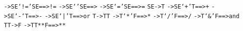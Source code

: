 {{{{\texttt{\small \phantom{ }-\textgreater \phantom{ }SE\phantom{ }‘!=’\phantom{ }SE\phantom{ }\phantom{ }\phantom{ }==\textgreater \phantom{ }!=}\mbox{}\newline
\texttt{\small \phantom{ }-\textgreater \phantom{ }SE\phantom{ }‘’\phantom{ }\phantom{ }SE\phantom{ }\phantom{ }\phantom{ }==\textgreater \phantom{ }}\mbox{}\newline
\texttt{\small \phantom{ }-\textgreater \phantom{ }SE\phantom{ }‘=’\phantom{ }SE\phantom{ }\phantom{ }\phantom{ }==\textgreater \phantom{ }=}\mbox{}\newline
\texttt{\small }\mbox{}\newline
\texttt{\small \phantom{ }SE\phantom{ }\phantom{ }-\textgreater \phantom{ }\phantom{ }T}\mbox{}\newline
\texttt{\small \phantom{ }-\textgreater \phantom{ }\phantom{ }SE\phantom{ }‘+’\phantom{ }T\phantom{ }\phantom{ }==\textgreater \phantom{ }+}\mbox{}\newline
\texttt{\small \phantom{ }-\textgreater \phantom{ }\phantom{ }SE\phantom{ }‘-‘\phantom{ }T\phantom{ }\phantom{ }==\textgreater \phantom{ }-}\mbox{}\newline
\texttt{\small \phantom{ }-\textgreater \phantom{ }\phantom{ }SE\phantom{ }‘|’\phantom{ }T\phantom{ }\phantom{ }==\textgreater \phantom{ }or}\mbox{}\newline
\texttt{\small }\mbox{}\newline
\texttt{\small \phantom{ }T\phantom{ }\phantom{ }-\textgreater \phantom{ }TT}\mbox{}\newline
\texttt{\small \phantom{ }-\textgreater \phantom{ }T\phantom{ }‘*’\phantom{ }F\phantom{ }\phantom{ }==\textgreater \phantom{ }*}\mbox{}\newline
\texttt{\small \phantom{ }-\textgreater \phantom{ }T\phantom{ }‘/’\phantom{ }F\phantom{ }\phantom{ }==\textgreater \phantom{ }/}\mbox{}\newline
\texttt{\small \phantom{ }-\textgreater \phantom{ }T\phantom{ }‘\&’\phantom{ }F\phantom{ }\phantom{ }==\textgreater \phantom{ }and}\mbox{}\newline
\texttt{\small }\mbox{}\newline
\texttt{\small \phantom{ }TT\phantom{ }-\textgreater \phantom{ }F}\mbox{}\newline
\texttt{\small \phantom{ }-\textgreater \phantom{ }TT**F\phantom{ }\phantom{ }\phantom{ }\phantom{ }==\textgreater \phantom{ }**}\mbox{}\newline
\texttt{\small }\mbox{}\newline
}}}}
